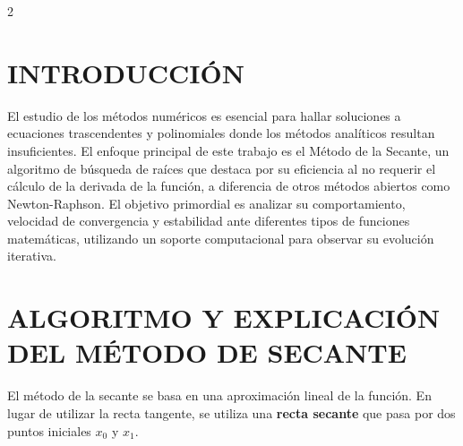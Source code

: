 \documentclass{rmf-d}
\begin{document}
\begin{multicols}{2}

\section{INTRODUCCIÓN}
\label{sec:1}
El estudio de los métodos numéricos es esencial para hallar soluciones a ecuaciones trascendentes y polinomiales donde los métodos analíticos resultan insuficientes. El enfoque principal de este trabajo es el Método de la Secante, un algoritmo de búsqueda de raíces que destaca por su eficiencia al no requerir el cálculo de la derivada de la función, a diferencia de otros métodos abiertos como Newton-Raphson. El objetivo primordial es analizar su comportamiento, velocidad de convergencia y estabilidad ante diferentes tipos de funciones matemáticas, utilizando un soporte computacional para observar su evolución iterativa.
































\section{ALGORITMO Y EXPLICACIÓN DEL
MÉTODO DE SECANTE}
\label{sec:2}
El método de la secante se basa en una aproximación lineal de la función. En lugar de utilizar la recta tangente, se utiliza una \textbf{recta secante} que pasa por dos puntos iniciales $x_0$ y $x_1$.


\end{multicols}
\end{document}
